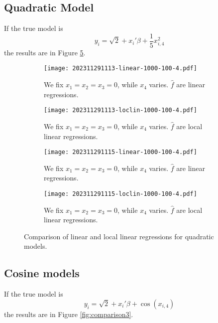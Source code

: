 \documentclass[12pt]{article}
\begin{document}
\subsection{Quadratic Model}

If the true model is 
\begin{equation*}
    y_{i} = \sqrt{2} + x_{i}'\beta + \frac{1}{5} x_{i,4}^{2}
\end{equation*}
the results are in Figure \ref{fig:comparison2}.



\begin{figure}[h]
    \centering
    \begin{subfigure}[b]{0.45\textwidth}
        \texttt{[image: 202311291113-linear-1000-100-4.pdf]}
        \caption{We fix \(x_{1} = x_{2} = x_{3} = 0\), while \(x_{4}\) varies. \(\hat{f}\) are linear regressions.}
        \label{fig:5}
    \end{subfigure}
    \hfill
    \begin{subfigure}[b]{0.45\textwidth}
        \texttt{[image: 202311291113-loclin-1000-100-4.pdf]}
        \caption{We fix \(x_{1} = x_{2} = x_{3} = 0\), while \(x_{4}\) varies. \(\hat{f}\) are local linear regressions.}
        \label{fig:6}
    \end{subfigure}
    \vfill
    \begin{subfigure}[b]{0.45\textwidth}
        \texttt{[image: 202311291115-linear-1000-100-4.pdf]}
        \caption{We fix \(x_{1} = x_{2} = x_{3} = 0\), while \(x_{4}\) varies. \(\hat{f}\) are linear regressions.}
        \label{fig:7}
    \end{subfigure}
    \hfill
    \begin{subfigure}[b]{0.45\textwidth}
        \texttt{[image: 202311291115-loclin-1000-100-4.pdf]}
        \caption{We fix \(x_{1} = x_{2} = x_{3} = 0\), while \(x_{4}\) varies. \(\hat{f}\) are local linear regressions.}
        \label{fig:8}
    \end{subfigure}
    \caption{Comparison of linear and local linear regressions for quadratic models.}
    \label{fig:comparison2}
\end{figure}
\newpage 


\subsection{Cosine models}
If the true model is 
\begin{equation*}
    y_{i} = \sqrt{2} + x_{i}'\beta + \cos(x_{i,4})
\end{equation*}
the results are in Figure \ref{fig:comparison3}.
\end{document}
